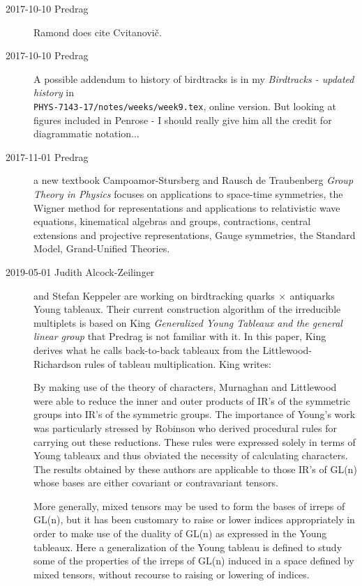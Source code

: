 \begin{description}
\item[2017-10-10  Predrag]
Ramond does cite Cvitanovi\v{c}.

\item[2017-10-10  Predrag]
A possible addendum to history of birdtracks is in my
{\em Birdtracks - updated history} in\\
\texttt{PHYS-7143-17/notes/weeks/week9.tex},
{online version}.
But looking at figures included in Penrose - I should
really give him all the credit for diagrammatic notation...

\item[2017-11-01  Predrag] a new textbook
Campoamor-Stursberg and Rausch de Traubenberg
{\em Group Theory in Physics} focuses on applications to space-time
symmetries, the Wigner method for representations and applications to
relativistic wave equations, kinematical algebras and groups,
contractions, central extensions and projective representations, Gauge
symmetries, the Standard Model, Grand-Unified Theories.

\item[2019-05-01 Judith Alcock-Zeilinger] and Stefan Keppeler
are working on birdtracking quarks$~\times~$antiquarks Young tableaux.
Their current construction algorithm of the irreducible multiplets is based on
King {\em Generalized {Young Tableaux} and the general linear group}
that Predrag is not familiar with it. In this paper, King derives what he calls
back-to-back tableaux from the Littlewood-Richardson rules of tableau
multiplication. King writes:

By making use of the theory of characters, Murnaghan and
Littlewood  were able to reduce the inner and outer products of
IR's of the symmetric groups into IR's of the symmetric groups. The importance of
Young's work was particularly stressed by Robinson who derived
procedural rules for carrying out these reductions. These rules were expressed
solely in terms of Young tableaux and thus obviated the necessity of calculating
characters. The results obtained by these authors are applicable to those IR's of
GL(n) whose bases are either covariant or contravariant tensors.

More generally, mixed tensors may be used to form the bases of irreps of GL(n),
but it has been customary to raise or lower indices appropriately in order to
make use of the duality of GL(n) as expressed in the Young tableaux. Here a
generalization of the Young tableau is defined to study some of the properties of
the irreps of GL(n) induced in a space defined by mixed tensors, without recourse
to raising or lowering of indices.


\end{description}
